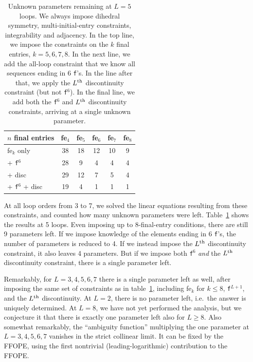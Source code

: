 \documentclass[12pt]{article}
\begin{document}
\renewcommand{\arraystretch}{1.25}
\begin{table}[!t]
\centering
\begin{tabular}[t]{l c c c c c}
\hline\hline
$n$ final entries & fe$_4$ & fe$_5$ & fe$_6$ & fe$_7$ & fe$_8$
\\\hline\hline
fe$_k$ only               &    38  &  18    &   12  &   10 &   9
\\\hline
+ {\tt f}$^6$             &    28  &   9    &    4  &   4  &   4
\\\hline
+ disc              &    29  &  12    &    7  &   5  &   4
\\\hline
+ {\tt f}$^6$ + disc      &    19  &   4    &    1  &   1  &   1
\\\hline
\end{tabular}
\caption{Unknown parameters remaining at $L=5$ loops. We always impose dihedral symmetry, multi-initial-entry constraints, integrability and adjacency.  In the top line, we impose the constraints on the $k$ final entries, $k=5,6,7,8$.  In the next line, we add the all-loop constraint that we know all sequences ending in 6 {\tt f}'s.   In the line after that, we apply the $L^{\rm th}$ discontinuity constraint (but not {\tt f}$^6$).  In the final line, we add both the {\tt f}$^6$ and 
$L^{\rm th}$ discontinuity constraints, arriving at a single unknown parameter.}
\label{tab:Leq5}
\end{table}

At all loop orders from 3 to 7, we solved the linear equations resulting from these constraints, and counted how many unknown parameters were left.  Table~\ref{tab:Leq5} shows the results at 5 loops.  Even imposing up to 8-final-entry conditions, there are still 9 parameters left.  If we impose knowledge of the elements ending in 6 {\tt f}'s, the number of parameters is reduced to 4.  If we instead impose the $L^{\rm th}$ discontinuity constraint, it also leaves 4 parameters.  But if we impose both {\tt f}$^6$ {\it and} the $L^{\rm th}$ discontinuity constraint, there is a single parameter left.

Remarkably, for $L=3,4,5,6,7$ there is a single parameter left as well, after imposing the same set of constraints as in table~\ref{tab:Leq5}, including fe$_k$ for $k\leq8$, {\tt f}$^{L+1}$, and the $L^{\rm th}$ discontinuity. At $L=2$, there is no parameter left, i.e.~the answer is uniquely determined.   At $L=8$, we have not yet performed the analysis, but we conjecture it that there is exactly one parameter left also for $L\geq 8$.   Also somewhat remarkably, the ``ambiguity function'' multiplying the one parameter at $L=3,4,5,6,7$ vanishes in the strict collinear limit.  It can be fixed by the FFOPE, using the first nontrivial (leading-logarithmic) contribution to the FFOPE.
\end{document}
